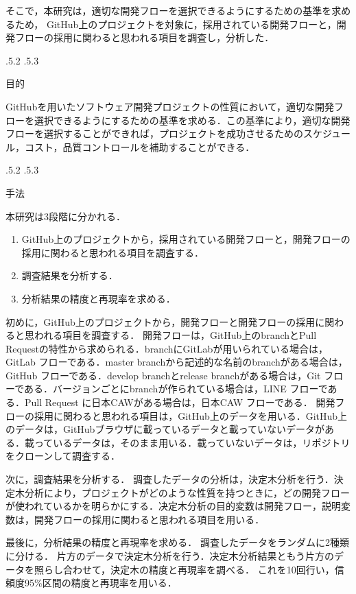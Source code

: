 \documentclass[uplatex,twocolumn]{jsarticle}
\makeatletter
\renewcommand{\section}{%
    \if@slide\clearpage\fi
    \@startsection{section}{1}{\z@}%
    {\Cvs \@plus.5\Cdp \@minus.2\Cdp}%
    {.5\Cvs \@plus.3\Cdp}%
    {\normalfont\raggedright}}
\makeatother
\begin{document}
そこで，本研究は，適切な開発フローを選択できるようにするための基準を求めるため，
GitHub上のプロジェクトを対象に，採用されている開発フローと，開発フローの採用に関わると思われる項目を調査し，分析した．

\section{目的}

GitHubを用いたソフトウェア開発プロジェクトの性質において，適切な開発フローを選択できるようにするための基準を求める．この基準により，適切な開発フローを選択することができれば，プロジェクトを成功させるためのスケジュール，コスト，品質コントロールを補助することができる．

\section{手法}


本研究は3段階に分かれる．
\begin{enumerate}
\item GitHub上のプロジェクトから，採用されている開発フローと，開発フローの採用に関わると思われる項目を調査する．
\item 調査結果を分析する．
\item 分析結果の精度と再現率を求める． 
\end{enumerate}

初めに，GitHub上のプロジェクトから，開発フローと開発フローの採用に関わると思われる項目を調査する．
開発フローは，GitHub上のbranchとPull Requestの特性から求められる．branchにGitLabが用いられている場合は，GitLab フローである．master branchから記述的な名前のbranchがある場合は，GitHub フローである．develop branchとrelease branchがある場合は，Git フローである．バージョンごとにbranchが作られている場合は，LINE フローである．Pull Request に日本CAWがある場合は，日本CAW フローである．
開発フローの採用に関わると思われる項目は，GitHub上のデータを用いる．GitHub上のデータは，GitHubブラウザに載っているデータと載っていないデータがある．載っているデータは，そのまま用いる．載っていないデータは，リポジトリをクローンして調査する．

次に，調査結果を分析する．
調査したデータの分析は，決定木分析を行う．決定木分析により，プロジェクトがどのような性質を持つときに，どの開発フローが使われているかを明らかにする．决定木分析の目的変数は開発フロー，説明変数は，開発フローの採用に関わると思われる項目を用いる．

最後に，分析結果の精度と再現率を求める．
調査したデータをランダムに2種類に分ける．
片方のデータで決定木分析を行う．决定木分析結果ともう片方のデータを照らし合わせて，決定木の精度と再現率を調べる．
これを10回行い，信頼度95\%区間の精度と再現率を用いる．
\end{document}

